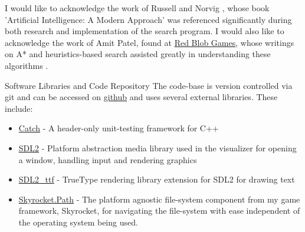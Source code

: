 
\begin{acknowledgements}
	I would like to acknowledge the work of Russell and Norvig \parencite{aiama}, whose book 'Artificial Intelligence: A Modern Approach' was referenced significantly during both research and implementation of the search program. I would also like to acknowledge the work of Amit Patel, found at \href{http://www.redblobgames.com/}{Red Blob Games}, whose writings on A* and heuristics-based search assisted greatly in understanding these algorithms \parencite{redblob}.
\end{acknowledgements}

\vspace{2em}

\begin{frontmatter}{Software Libraries and Code Repository}
The code-base is version controlled via git and can be accessed on \href{https://github.com/jacobmilligan/robonav}{github} and uses several external libraries. These include:
\begin{itemize}
	\item \href{https://github.com/philsquared/Catch}{Catch} - A header-only unit-testing framework for C++
	\item \href{https://www.libsdl.org/download-2.0.php}{SDL2} - Platform abstraction media library used in the visualizer for opening a window, handling input and rendering graphics
	\item \href{https://www.libsdl.org/projects/SDL_ttf/}{SDL2\_ttf} - TrueType rendering library extension for SDL2 for drawing text
	\item \href{https://github.com/jacobmilligan/Skyrocket}{Skyrocket.Path} - The platform agnostic file-system component from my game framework, Skyrocket, for navigating the file-system with ease independent of the operating system being used.
\end{itemize}
\end{frontmatter}
